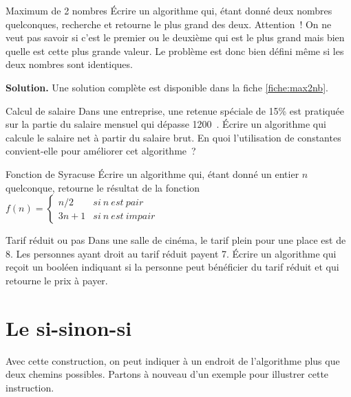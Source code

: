 	\begin{Exercice}{Maximum de 2 nombres}
		Écrire un algorithme qui, étant donné deux nombres quelconques,
		recherche et retourne le plus grand des deux. Attention~! On ne veut
		pas savoir si c’est le premier ou le deuxième qui est
		le plus grand mais bien quelle est cette plus grande valeur. Le
		problème est donc bien défini même si les deux nombres sont
		identiques.
		
		\textbf{Solution.}
		Une solution complète est disponible dans la fiche \vref{fiche:max2nb}.
	\end{Exercice}
	
	\begin{Exercice}{Calcul de salaire}
		Dans une entreprise, 
		une retenue spéciale de 15\% est pratiquée 
		sur la partie du salaire mensuel qui dépasse 1200~\texteuro. 
		Écrire un algorithme qui calcule le salaire net à partir du salaire brut. 
		En quoi l’utilisation de constantes convient-elle pour améliorer cet algorithme~?
	\end{Exercice}

	\begin{Exercice}{Fonction de Syracuse}
		Écrire un algorithme qui, étant donné un entier $n$ quelconque,
		retourne le résultat de la fonction
		$f(n)=
			\left\{
			\begin{array}{rl}
				n/2 & si \ n \ est\ pair\\
				3n+1 & si \ n \ est \ impair
			\end{array}
			\right.$
	\end{Exercice}

	\begin{Exercice}{Tarif réduit ou pas}
		Dans une salle de cinéma,
		le tarif plein pour une place est de 8\texteuro{}.
		Les personnes ayant droit au tarif réduit payent 7\texteuro{}.
		Écrire un algorithme qui reçoit un booléen
		indiquant si la personne peut bénéficier du tarif réduit
		et qui retourne le prix à payer.
	\end{Exercice}

\section{Le si-sinon-si}

	Avec cette construction,
	on peut indiquer à un endroit de l’algorithme
	plus que deux chemins possibles.
	Partons à nouveau d’un exemple pour illustrer cette instruction.
	
